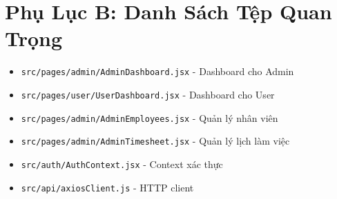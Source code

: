 \documentclass[12pt,a4paper]{report}
\begin{document}
\section{Phụ Lục B: Danh Sách Tệp Quan Trọng}

\begin{itemize}
    \item \texttt{src/pages/admin/AdminDashboard.jsx} - Dashboard cho Admin
    \item \texttt{src/pages/user/UserDashboard.jsx} - Dashboard cho User
    \item \texttt{src/pages/admin/AdminEmployees.jsx} - Quản lý nhân viên
    \item \texttt{src/pages/admin/AdminTimesheet.jsx} - Quản lý lịch làm việc
    \item \texttt{src/auth/AuthContext.jsx} - Context xác thực
    \item \texttt{src/api/axiosClient.js} - HTTP client
\end{itemize}
\end{document}
